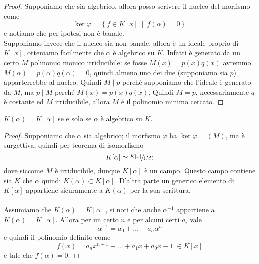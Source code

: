 \begin{proof}
	Supponiamo che sia algebrico, allora posso scrivere il nucleo del morfismo come 
	\begin{equation*}
	\ker\varphi = \left\{f\in K[x] \ \mid \ f(\alpha)=0\right\}
	\end{equation*}
	e notiamo che per ipotesi non è banale. \\ Supponiamo invece che il nucleo sia non banale, allora è un ideale proprio di $K[x]$, otteniamo facilmente che $\alpha$ è algebrico su $K$. Infatti è generato da un certo $M$ polinomio monico irriducibile: se fosse $M(x)=p(x)q(x)$ avremmo $M(\alpha)=p(\alpha)q(\alpha)=0$, quindi almeno uno dei due (supponiamo sia $p$) apparterrebbe al nucleo. Quindi $M \mid p$ perché supponiamo che l'ideale è generato da $M$, ma $p\mid M$ perché $M(x) = p(x)q(x)$. Quindi $M = p$, necessariamente $q$ è costante ed $M$ irriducibile, allora $M$ è il polinomio minimo cercato.
\end{proof}
\begin{teorema}
	$K(\alpha)=K[\alpha]$ se e solo se $\alpha$ è algebrico su $K$.
\end{teorema}
\begin{proof}
	Supponiamo che $\alpha$ sia algebrico; il morfismo $\varphi$ ha $\ker \varphi = (M)$, ma è surgettiva, quindi per teorema di isomorfismo
	\begin{equation*}
	K[\alpha]\simeq\sfrac{K[x]}{(M)}
	\end{equation*}
	dove siccome $M$ è irriducibile, dunque $K[\alpha]$ è un campo. Questo campo contiene sia $K$ che $\alpha$ quindi $K(\alpha)\subset K[\alpha]$. D'altra parte un generico elemento di $K[\alpha]$ appartiene sicuramente a $K(\alpha)$ per la sua scrittura. \\ \\
	Assumiamo che $K(\alpha)=K[\alpha]$, si noti che anche $\alpha^{-1}$ appartiene a $K(\alpha)=K[\alpha]$. Allora per un certo $n$ e per alcuni certi $a_i$ vale
	\begin{equation*}
	\alpha^{-1}=a_0+\dots+a_n\alpha^n
	\end{equation*}
	e quindi il polinomio definito come
	\begin{equation*}
	f(x)=a_nx^{n+1}+\dots+a_1x+a_0x-1 \ \in K[x]
	\end{equation*}
	è tale che $f(\alpha)=0$.
\end{proof}
